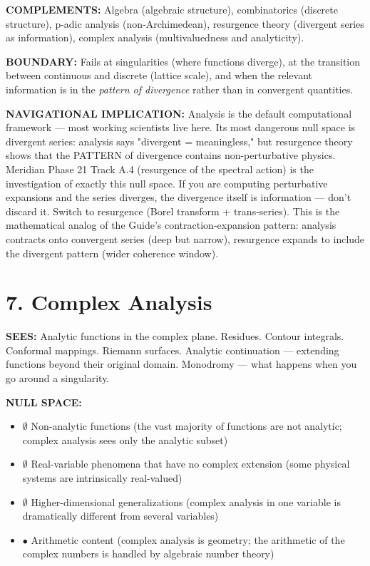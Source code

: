 \textbf{COMPLEMENTS:} Algebra (algebraic structure), combinatorics (discrete structure), p-adic analysis (non-Archimedean), resurgence theory (divergent series as information), complex analysis (multivaluedness and analyticity).


\textbf{BOUNDARY:} Fails at singularities (where functions diverge), at the transition between continuous and discrete (lattice scale), and when the relevant information is in the \textit{pattern of divergence} rather than in convergent quantities.


\textbf{NAVIGATIONAL IMPLICATION:} Analysis is the default computational framework — most working scientists live here. Its most dangerous null space is divergent series: analysis says "divergent = meaningless," but resurgence theory shows that the PATTERN of divergence contains non-perturbative physics. Meridian Phase 21 Track A.4 (resurgence of the spectral action) is the investigation of exactly this null space. If you are computing perturbative expansions and the series diverges, the divergence itself is information — don't discard it. Switch to resurgence (Borel transform + trans-series). This is the mathematical analog of the Guide's contraction-expansion pattern: analysis contracts onto convergent series (deep but narrow), resurgence expands to include the divergent pattern (wider coherence window).


\bigskip\noindent\makebox[\textwidth]{\color{rulegray}\rule{5cm}{0.3pt}}\bigskip


\section*{7. Complex Analysis}


\textbf{SEES:} Analytic functions in the complex plane. Residues. Contour integrals. Conformal mappings. Riemann surfaces. Analytic continuation — extending functions beyond their original domain. Monodromy — what happens when you go around a singularity.


\textbf{NULL SPACE:}

\begin{itemize}[nosep,leftmargin=*]
  \item $\emptyset$ Non-analytic functions (the vast majority of functions are not analytic; complex analysis sees only the analytic subset)
  \item $\emptyset$ Real-variable phenomena that have no complex extension (some physical systems are intrinsically real-valued)
  \item $\emptyset$ Higher-dimensional generalizations (complex analysis in one variable is dramatically different from several variables)
  \item $\bullet$ Arithmetic content (complex analysis is geometry; the arithmetic of the complex numbers is handled by algebraic number theory)
\end{itemize}


